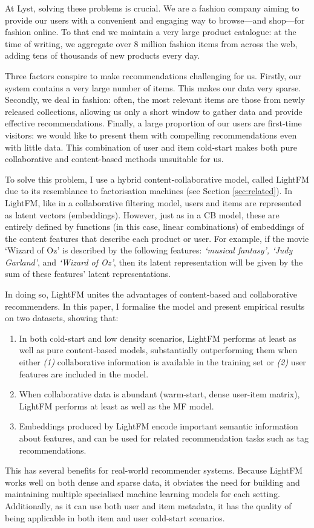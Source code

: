 \documentclass{sig-alternate}
\providecommand\authInstitution{Lyst}
\begin{document}
At \authInstitution{}, solving these problems is crucial. We are a fashion company aiming to provide our users with a convenient and engaging way to browse---and shop---for fashion online. To that end we maintain a very large product catalogue: at the time of writing, we aggregate over 8 million fashion items from across the web, adding tens of thousands of new products every day.

Three factors conspire to make recommendations challenging for us. Firstly, our system contains a very large number of items. This makes our data very sparse. Secondly, we deal in fashion: often, the most relevant items are those from newly released collections, allowing us only a short window to gather data and provide effective recommendations. Finally, a large proportion of our users are first-time visitors: we would like to present them with compelling recommendations even with little data. This combination of user and item cold-start makes both pure collaborative and content-based methods unsuitable for us.

To solve this problem, I use a hybrid content-collaborative model, called LightFM due to its resemblance to factorisation machines (see Section \ref{sec:related}). In LightFM, like in a collaborative filtering model, users and items are represented as latent vectors (embeddings). However, just as in a CB model, these are entirely defined by functions (in this case, linear combinations) of embeddings of the content features that describe each product or user. For example, if the movie `Wizard of Oz' is described by the following features: \textit{`musical fantasy', `Judy Garland'}, and \textit{`Wizard of Oz'}, then its latent representation will be given by the sum of these features' latent representations. 

In doing so, LightFM unites the advantages of content-based and collaborative recommenders. In this paper, I formalise the model and present empirical results on two datasets, showing that:
\begin{enumerate}
\item In both cold-start and low density scenarios, LightFM performs at least as well as pure content-based models, substantially outperforming them when either \textit{(1)} collaborative information is available in the training set or \textit{(2)} user features are included in the model.
\item When collaborative data is abundant (warm-start, dense user-item matrix), LightFM performs at least as well as the MF model.
\item Embeddings produced by LightFM encode important semantic information about features, and can be used for related recommendation tasks such as tag recommendations.
\end{enumerate}
This has several benefits for real-world recommender systems. Because LightFM works well on both dense and sparse data, it obviates the need for building and maintaining multiple specialised machine learning models for each setting. Additionally, as it can use both user and item metadata, it has the quality of being applicable in both item and user cold-start scenarios.
\end{document}

